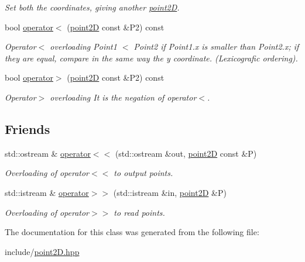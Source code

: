 \begin{DoxyCompactItemize}
\begin{DoxyCompactList}\small\item\em Set both the coordinates, giving another \hyperlink{classpoint2D}{point2D}. \item\end{DoxyCompactList}\item 
\hypertarget{classpoint2D_a376a4be826f9a5f8568093c844b93535}{
bool \hyperlink{classpoint2D_a376a4be826f9a5f8568093c844b93535}{operator$<$} (\hyperlink{classpoint2D}{point2D} const \&P2) const }
\label{classpoint2D_a376a4be826f9a5f8568093c844b93535}

\begin{DoxyCompactList}\small\item\em Operator$<$ overloading  Point1 $<$ Point2 if Point1.x is smaller than Point2.x; if they are equal, compare in the same way the y coordinate. (Lexicografic ordering). \item\end{DoxyCompactList}\item 
\hypertarget{classpoint2D_ad0304b582566511bda14f4f3344e657e}{
bool \hyperlink{classpoint2D_ad0304b582566511bda14f4f3344e657e}{operator$>$} (\hyperlink{classpoint2D}{point2D} const \&P2) const }
\label{classpoint2D_ad0304b582566511bda14f4f3344e657e}

\begin{DoxyCompactList}\small\item\em Operator$>$ overloading  It is the negation of operator$<$. \item\end{DoxyCompactList}\end{DoxyCompactItemize}
\subsection*{Friends}
\begin{DoxyCompactItemize}
\item 
\hypertarget{classpoint2D_ad8d497e0945a49c204fd68c728439d8c}{
std::ostream \& \hyperlink{classpoint2D_ad8d497e0945a49c204fd68c728439d8c}{operator$<$$<$} (std::ostream \&out, \hyperlink{classpoint2D}{point2D} const \&P)}
\label{classpoint2D_ad8d497e0945a49c204fd68c728439d8c}

\begin{DoxyCompactList}\small\item\em Overloading of operator$<$$<$ to output points. \item\end{DoxyCompactList}\item 
\hypertarget{classpoint2D_ae0bf9b9232c561d90d7cfd12e8268da7}{
std::istream \& \hyperlink{classpoint2D_ae0bf9b9232c561d90d7cfd12e8268da7}{operator$>$$>$} (std::istream \&in, \hyperlink{classpoint2D}{point2D} \&P)}
\label{classpoint2D_ae0bf9b9232c561d90d7cfd12e8268da7}

\begin{DoxyCompactList}\small\item\em Overloading of operator$>$$>$ to read points. \item\end{DoxyCompactList}\end{DoxyCompactItemize}


The documentation for this class was generated from the following file:\begin{DoxyCompactItemize}
\item 
include/\hyperlink{point2D_8hpp}{point2D.hpp}\end{DoxyCompactItemize}
